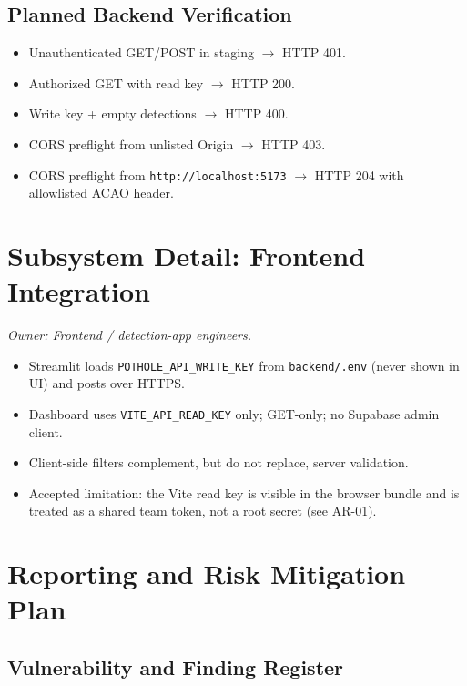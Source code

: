 \documentclass[12pt]{article}
\begin{document}
\subsection{Planned Backend Verification}

\begin{itemize}
    \item Unauthenticated GET/POST in staging $\rightarrow$ HTTP 401.
    \item Authorized GET with read key $\rightarrow$ HTTP 200.
    \item Write key + empty detections $\rightarrow$ HTTP 400.
    \item CORS preflight from unlisted Origin $\rightarrow$ HTTP 403.
    \item CORS preflight from \texttt{http://localhost:5173} $\rightarrow$
          HTTP 204 with allowlisted ACAO header.
\end{itemize}

\section{Subsystem Detail: Frontend Integration}
\label{sec:frontend}
\textit{Owner: Frontend / detection-app engineers.}

\begin{itemize}
    \item Streamlit loads \texttt{POTHOLE\_API\_WRITE\_KEY} from
          \texttt{backend/.env} (never shown in UI) and posts over HTTPS.
    \item Dashboard uses \texttt{VITE\_API\_READ\_KEY} only; GET-only; no
          Supabase admin client.
    \item Client-side filters complement, but do not replace, server validation.
    \item Accepted limitation: the Vite read key is visible in the browser
          bundle and is treated as a shared team token, not a root secret
          (see AR-01).
\end{itemize}

\section{Reporting and Risk Mitigation Plan}
\label{sec:reporting}

\subsection{Vulnerability and Finding Register}
\end{document}

